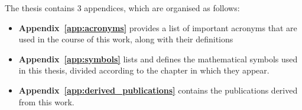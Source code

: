 The thesis contains 3 appendices, which are organised as follows:

\begin{itemize}
\item\textbf{Appendix~\ref{app:acronyms}} provides a list of important acronyms that are used in the course of this work, along with their definitions

\item\textbf{Appendix~\ref{app:symbols}} lists and defines the mathematical symbols used in this thesis, divided according to the chapter in which they appear.

\item\textbf{Appendix~\ref{app:derived_publications}} contains the publications derived from this work.

\end{itemize}







